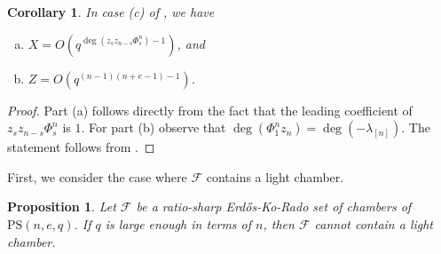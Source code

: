 \documentclass[11pt]{article}
\newtheorem{cor}[thm]{Corollary}
\newtheorem{prop}[thm]{Proposition}
\newcommand{\EKR}{\mathcal{F}}
\newcommand{\PS}{\mathrm{PS}}
\newcommand{\red}[1]{\textcolor{red}{#1}}
\renewcommand{\le}{\leqslant}
\begin{document}
\begin{cor} \label{C: light degree} 
In case (c) of , we have
\begin{enumerate} [(a)]
	\item  $X=O(q^{\deg(z_sz_{n-s}\Phi_s^n)-1})$, and %
	\item  $Z=O(q^{(n-1)(n+e-1)-1})$. %
\end{enumerate}
\end{cor}
\begin{proof}
Part (a) follows directly from the fact that the leading coefficient of $z_sz_{n-s}\Phi_s^n$ is $1$.
For part (b) observe that $\deg(\Phi_1^nz_n)=\deg(-\lambda_{[n]})$. The statement follows from . 
\end{proof}



 First, we consider the case where $\EKR$ contains a light chamber.




\begin{prop} \label{P: light chamber}
	Let $\EKR$ be a ratio-sharp Erd\H os-Ko-Rado set of chambers of $\PS(n,e,q)$. 
    If $q$ is large enough in terms of $n$, then $\EKR$ cannot contain a light chamber.
\end{prop}

\end{document}
